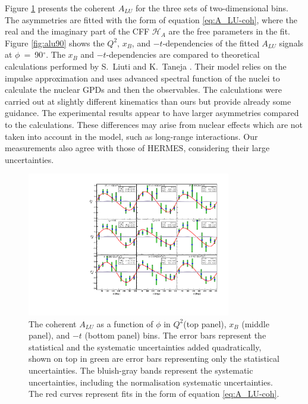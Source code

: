 \documentclass[nofootinbib,twocolumn,showpacs,prl,superscriptaddress,secnumarabic,amssymb,nobibnotes,aps,floatfix]{revtex4}
\begin{document}
Figure \ref{fig:alu} presents the coherent $A_{LU}$ for the three
sets of two-dimensional bins. The asymmetries are fitted with the form of
equation \ref{eq:A_LU-coh}, where the real and the imaginary part of the CFF
$\mathcal{H}_{A}$ are the free parameters in the fit. Figure \ref{fig:alu90} 
shows the $Q^2$, $x_{B}$, and $-t$-dependencies of the fitted $A_{LU}$ signals 
at $\phi$~=~90$^{\circ}$. The $x_{B}$ and $-t$-dependencies are compared to 
theoretical calculations performed by S.~Liuti and K.~Taneja 
\cite{simonetta_2}. Their model relies on the impulse approximation and uses 
advanced spectral function of the nuclei to calculate the nuclear GPDs and then 
the observables. The calculations were carried out at slightly different 
kinematics than ours but provide already some guidance. The experimental 
results appear to have larger asymmetries compared to the calculations.  These 
differences may arise from nuclear effects which are not taken into account in 
the model, such as long-range interactions. Our measurements also agree with 
those of HERMES, considering their large uncertainties.


\begin{figure}[tb]
\includegraphics[width=8.9cm]{figs/coherent-ALU.pdf}
\caption{The coherent $A_{LU}$ as a function of $\phi$ in
   $Q^{2}$(top panel), $x_{B}$ (middle panel), and $-t$ (bottom panel) bins.  
   The error bars represent the statistical and the systematic uncertainties 
   added quadratically, shown on top in green are error bars representing only 
   the statistical uncertainties. The bluish-gray bands represent the 
   systematic uncertainties, including the normalisation systematic 
uncertainties. The red curves represent fits in the form of equation 
\ref{eq:A_LU-coh}.}
\label{fig:alu}
\end{figure}
\end{document}
